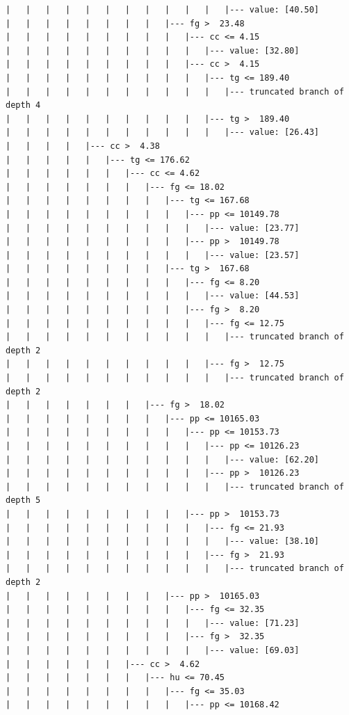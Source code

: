 \documentclass[UTF8, a4paper]{ctexart}
\begin{document}
\begin{lstlisting}
|   |   |   |   |   |   |   |   |   |   |   |--- value: [40.50]
|   |   |   |   |   |   |   |   |--- fg >  23.48
|   |   |   |   |   |   |   |   |   |--- cc <= 4.15
|   |   |   |   |   |   |   |   |   |   |--- value: [32.80]
|   |   |   |   |   |   |   |   |   |--- cc >  4.15
|   |   |   |   |   |   |   |   |   |   |--- tg <= 189.40
|   |   |   |   |   |   |   |   |   |   |   |--- truncated branch of depth 4
|   |   |   |   |   |   |   |   |   |   |--- tg >  189.40
|   |   |   |   |   |   |   |   |   |   |   |--- value: [26.43]
|   |   |   |   |--- cc >  4.38
|   |   |   |   |   |--- tg <= 176.62
|   |   |   |   |   |   |--- cc <= 4.62
|   |   |   |   |   |   |   |--- fg <= 18.02
|   |   |   |   |   |   |   |   |--- tg <= 167.68
|   |   |   |   |   |   |   |   |   |--- pp <= 10149.78
|   |   |   |   |   |   |   |   |   |   |--- value: [23.77]
|   |   |   |   |   |   |   |   |   |--- pp >  10149.78
|   |   |   |   |   |   |   |   |   |   |--- value: [23.57]
|   |   |   |   |   |   |   |   |--- tg >  167.68
|   |   |   |   |   |   |   |   |   |--- fg <= 8.20
|   |   |   |   |   |   |   |   |   |   |--- value: [44.53]
|   |   |   |   |   |   |   |   |   |--- fg >  8.20
|   |   |   |   |   |   |   |   |   |   |--- fg <= 12.75
|   |   |   |   |   |   |   |   |   |   |   |--- truncated branch of depth 2
|   |   |   |   |   |   |   |   |   |   |--- fg >  12.75
|   |   |   |   |   |   |   |   |   |   |   |--- truncated branch of depth 2
|   |   |   |   |   |   |   |--- fg >  18.02
|   |   |   |   |   |   |   |   |--- pp <= 10165.03
|   |   |   |   |   |   |   |   |   |--- pp <= 10153.73
|   |   |   |   |   |   |   |   |   |   |--- pp <= 10126.23
|   |   |   |   |   |   |   |   |   |   |   |--- value: [62.20]
|   |   |   |   |   |   |   |   |   |   |--- pp >  10126.23
|   |   |   |   |   |   |   |   |   |   |   |--- truncated branch of depth 5
|   |   |   |   |   |   |   |   |   |--- pp >  10153.73
|   |   |   |   |   |   |   |   |   |   |--- fg <= 21.93
|   |   |   |   |   |   |   |   |   |   |   |--- value: [38.10]
|   |   |   |   |   |   |   |   |   |   |--- fg >  21.93
|   |   |   |   |   |   |   |   |   |   |   |--- truncated branch of depth 2
|   |   |   |   |   |   |   |   |--- pp >  10165.03
|   |   |   |   |   |   |   |   |   |--- fg <= 32.35
|   |   |   |   |   |   |   |   |   |   |--- value: [71.23]
|   |   |   |   |   |   |   |   |   |--- fg >  32.35
|   |   |   |   |   |   |   |   |   |   |--- value: [69.03]
|   |   |   |   |   |   |--- cc >  4.62
|   |   |   |   |   |   |   |--- hu <= 70.45
|   |   |   |   |   |   |   |   |--- fg <= 35.03
|   |   |   |   |   |   |   |   |   |--- pp <= 10168.42

\end{lstlisting}
\end{document}
